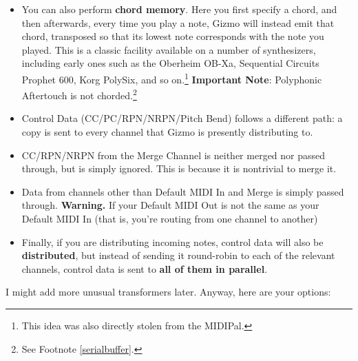\documentclass{article}
\begin{document}
\begin{itemize}
\item You can also perform {\bf chord memory}.  Here you first specify a chord, and then afterwards, every time you play a note, Gizmo will instead emit that chord, transposed so that its lowest note corresponds with the note you played.  This is a classic facility available on a number of synthesizers, including early ones such as the Oberheim OB-Xa, Sequential Circuits Prophet 600, Korg PolySix, and so on.\footnote{This idea was also directly stolen from the MIDIPal.}   {\bf Important Note}: Polyphonic Aftertouch is not chorded.\footnote{See Footnote \ref{serialbuffer}.}

\item Control Data (CC/PC/RPN/NRPN/Pitch Bend) follows a different path: a copy is sent to every channel that Gizmo is presently distributing to.  

\item CC/RPN/NRPN from the Merge Channel is neither merged nor passed through, but is simply ignored.  This is because it is nontrivial to merge it.

\item Data from channels other than Default MIDI In and Merge is simply passed through.  {\bf Warning.}  If your Default MIDI Out is not the same as your Default MIDI In (that is, you're routing from one channel to another) 

\item Finally, if you are distributing incoming notes, control data will also be {\bf distributed}, but instead of sending it round-robin to each of the relevant channels, control data is sent to {\bf all of them in parallel}.

\end{itemize}

I might add more unusual transformers later.  Anyway, here are your options:
\end{document}
